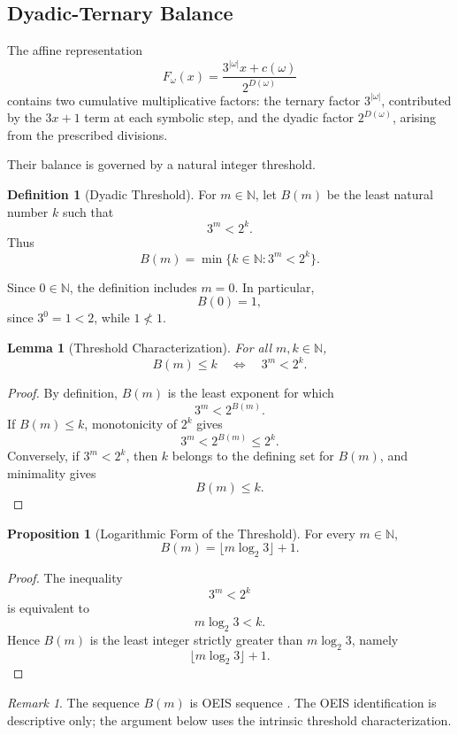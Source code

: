 \documentclass[12pt, oneside]{article}
\numberwithin{equation}{section}
\theoremstyle{definition}
\newtheorem{definition}{Definition}[section]
\newtheorem{proposition}{Proposition}[section]
\theoremstyle{plain}
\newtheorem{lemma}[theorem]{Lemma}
\theoremstyle{remark}
\newtheorem*{remark}{Remark}
\begin{document}
\subsection{Dyadic-Ternary Balance}

The affine representation
\[
F_\omega(x)
=
\frac{3^{|\omega|}x+c(\omega)}
     {2^{D(\omega)}}
\]
contains two cumulative multiplicative factors: the ternary factor
\(3^{|\omega|}\), contributed by the \(3x+1\) term at each symbolic step,
and the dyadic factor \(2^{D(\omega)}\), arising from the prescribed
divisions.

Their balance is governed by a natural integer threshold.

\begin{definition}[Dyadic Threshold]
For \(m\in\mathbb N\), let \(B(m)\) be the least natural number \(k\)
such that
\[
3^m<2^k.
\]
Thus
\[
B(m)
=
\min\{k\in\mathbb N:3^m<2^k\}.
\]
\end{definition}

Since \(0\in\mathbb N\), the definition includes \(m=0\). In particular,
\[
B(0)=1,
\]
since \(3^0=1<2\), while \(1\nless 1\).

\begin{lemma}[Threshold Characterization]
For all \(m,k\in\mathbb N\),
\[
B(m)\le k
\quad\Longleftrightarrow\quad
3^m<2^k.
\]
\end{lemma}

\begin{proof}
By definition, \(B(m)\) is the least exponent for which
\[
3^m<2^{B(m)}.
\]
If \(B(m)\le k\), monotonicity of \(2^k\) gives
\[
3^m<2^{B(m)}\le2^k.
\]
Conversely, if \(3^m<2^k\), then \(k\) belongs to the defining set for
\(B(m)\), and minimality gives
\[
B(m)\le k.
\]
\end{proof}

\begin{proposition}[Logarithmic Form of the Threshold]
For every \(m\in\mathbb N\),
\[
B(m)
=
\lfloor m\log_2 3\rfloor+1.
\]
\end{proposition}

\begin{proof}
The inequality
\[
3^m<2^k
\]
is equivalent to
\[
m\log_2 3<k.
\]
Hence \(B(m)\) is the least integer strictly greater than
\(m\log_2 3\), namely
\[
\lfloor m\log_2 3\rfloor+1.
\]
\end{proof}

\begin{remark}
The sequence \(B(m)\) is OEIS sequence .
The OEIS identification is descriptive only; the argument below uses the
intrinsic threshold characterization.
\end{remark}
\end{document}
